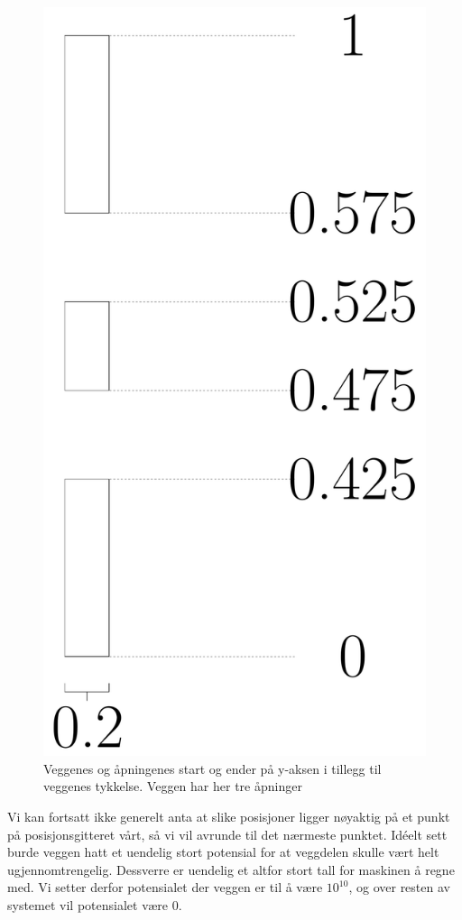 \documentclass[reprint,english,notitlepage]{revtex4-2}  %
\begin{document}
\begin{figure}[H]
	\centering 
	\includegraphics[scale=0.1]{../Images/NewWalls.pdf}
	\caption{Veggenes og åpningenes start og ender på y-aksen i tillegg til veggenes tykkelse. Veggen har her tre åpninger}
	\label{fig:Wall3}
\end{figure}
Vi kan fortsatt ikke generelt anta at slike posisjoner ligger nøyaktig på et punkt på posisjonsgitteret vårt, så vi vil avrunde til det nærmeste punktet. 
\newline Idéelt sett burde veggen hatt et uendelig stort potensial for at veggdelen skulle vært helt ugjennomtrengelig. Dessverre er uendelig et altfor stort tall for maskinen å regne med. Vi setter derfor potensialet der veggen er til å være $10^{10}$, og over resten av systemet vil potensialet være $0$.
\end{document}
